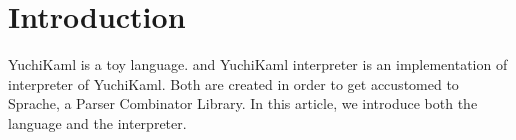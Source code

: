 \section{Introduction}

YuchiKaml is a toy language. and YuchiKaml interpreter is an implementation of interpreter of YuchiKaml.
Both are created in order to get accustomed to Sprache, a \cs Parser Combinator Library.
In this article, we introduce both the language and the interpreter.
